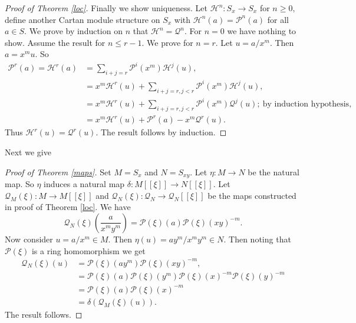 \documentclass{amsart}
\newcommand{\Pc}{\mathcal{P} }
\newcommand{\Qc}{\mathcal{Q} }
\newcommand{\Hc}{\mathcal{H} }
\newcommand{\rt}{\rightarrow}
\theoremstyle{plain}
\theoremstyle{definition}
\theoremstyle{remark}
\begin{document}
\begin{proof}[Proof of Theorem \ref{loc}]
Finally we show uniqueness. Let $\Hc^n \colon S_x \rt S_x$  for $n \geq 0, $ define another Cartan module structure on $S_x$ with $\Hc^n(a) = \Pc^n(a)$ for all $a \in S$. We prove by induction on $n$ that $\Hc^n = \Qc^n$. For $n = 0$ we have nothing to show. Assume the result for $n \leq r -1$. We prove for $n = r$. Let $u = a/x^m$. Then $a = x^mu$. So
\begin{align*}
  \Pc^r(a) = \Hc^r(a)  &= \sum_{i+j = r}\Pc^i(x^m)\Hc^j(u), \\
  &= x^m\Hc^r(u) +  \sum_{i+j = r, j<r}\Pc^i(x^m)\Hc^j(u),\\
  &= x^m\Hc^r(u) +  \sum_{i+j = r, j<r}\Pc^i(x^m)\Qc^j(u); \ \text{by induction hypothesis}, \\
   & = x^m\Hc^r(u)  + \Pc^r(a) - x^m\Qc^r(u).
\end{align*}
Thus $\Hc^r(u) = \Qc^r(u)$. The result follows by induction.
\end{proof}

Next we give
\begin{proof}
[Proof of Theorem \ref{maps}] Set $M = S_x$ and $N = S_{xy}$. Let $\eta \colon M \rt N$ be the natural map. So $\eta$ induces a natural map $\delta \colon M[[\xi]] \rt N[[\xi]]$. Let $\Qc_M(\xi) \colon M \rt M[[\xi]]$ and $\Qc_N(\xi) \colon \Qc_N \rt \Qc_N[[\xi]]$ be the maps constructed in proof of Theorem \ref{loc}. We have
$$\Qc_N(\xi)(\frac{a}{x^my^m}) = \Pc(\xi)(a)\Pc(\xi)(xy)^{-m}.$$
Now consider $u = a/x^m \in M$. Then $\eta(u) = ay^m/x^my^m \in N$. Then noting that $\Pc(\xi)$ is a ring homomorphism we get
\begin{align*}
  \Qc_N(\xi)(u) &=  \Pc(\xi)(ay^m)\Pc(\xi)(xy)^{-m},\\
  &=  \Pc(\xi)(a)\Pc(\xi)(y^m) \Pc(\xi)(x)^{-m}\Pc(\xi)(y)^{-m}\\
  &= \Pc(\xi)(a)\Pc(\xi)(x)^{-m} \\
  &= \delta(\Qc_M(\xi)(u)).
\end{align*}
The result follows.
\end{proof}
\end{document}
